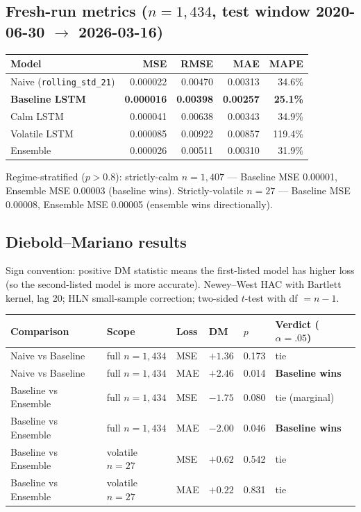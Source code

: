 \documentclass[11pt]{article}
\begin{document}
\subsection*{Fresh-run metrics ($n=1{,}434$, test window 2020-06-30 $\to$ 2026-03-16)}

\begin{center}
\begin{tabular}{lrrrr}
\toprule
Model & MSE & RMSE & MAE & MAPE \\
\midrule
Naive (\texttt{rolling\_std\_21}) & 0.000022 & 0.00470 & 0.00313 & 34.6\% \\
\textbf{Baseline LSTM}            & \textbf{0.000016} & \textbf{0.00398} & \textbf{0.00257} & \textbf{25.1\%} \\
Calm LSTM                         & 0.000041 & 0.00638 & 0.00343 & 34.9\% \\
Volatile LSTM                     & 0.000085 & 0.00922 & 0.00857 & 119.4\% \\
Ensemble                          & 0.000026 & 0.00511 & 0.00310 & 31.9\% \\
\bottomrule
\end{tabular}
\end{center}

Regime-stratified ($p > 0.8$): strictly-calm $n=1{,}407$ --- Baseline MSE 0.00001, Ensemble MSE 0.00003 (baseline wins). Strictly-volatile $n=27$ --- Baseline MSE 0.00008, Ensemble MSE 0.00005 (ensemble wins directionally).

\subsection*{Diebold--Mariano results}

Sign convention: positive DM statistic means the first-listed model has higher loss (so the second-listed model is more accurate). Newey--West HAC with Bartlett kernel, lag 20; HLN small-sample correction; two-sided $t$-test with df $= n-1$.

\begin{center}
\renewcommand{\arraystretch}{1.1}
\begin{tabular}{@{}p{4cm}p{3cm}llll@{}}
\toprule
Comparison & Scope & Loss & DM & $p$ & Verdict ($\alpha=.05$) \\
\midrule
Naive vs Baseline    & full $n=1{,}434$          & MSE & $+1.36$ & 0.173 & tie \\
Naive vs Baseline    & full $n=1{,}434$          & MAE & $+2.46$ & 0.014 & \textbf{Baseline wins} \\
Baseline vs Ensemble & full $n=1{,}434$          & MSE & $-1.75$ & 0.080 & tie (marginal) \\
Baseline vs Ensemble & full $n=1{,}434$          & MAE & $-2.00$ & 0.046 & \textbf{Baseline wins} \\
Baseline vs Ensemble & volatile $n=27$           & MSE & $+0.62$ & 0.542 & tie \\
Baseline vs Ensemble & volatile $n=27$           & MAE & $+0.22$ & 0.831 & tie \\
\bottomrule
\end{tabular}
\end{center}
\end{document}
